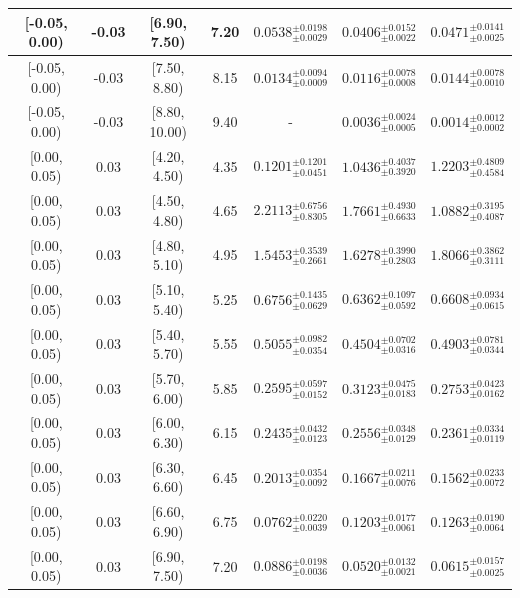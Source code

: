 \begin{longtable}{|c|c|c|c|c|c|c|}
\hline
[-0.05, 0.00) & -0.03 & [6.90, 7.50) & 7.20 & $0.0538^{ \pm 0.0198 }_{ \pm 0.0029 }$ & $0.0406^{ \pm 0.0152 }_{ \pm 0.0022 }$ & $0.0471^{ \pm 0.0141 }_{ \pm 0.0025 }$ \\ 
\hline
[-0.05, 0.00) & -0.03 & [7.50, 8.80) & 8.15 & $0.0134^{ \pm 0.0094 }_{ \pm 0.0009 }$ & $0.0116^{ \pm 0.0078 }_{ \pm 0.0008 }$ & $0.0144^{ \pm 0.0078 }_{ \pm 0.0010 }$ \\ 
\hline
[-0.05, 0.00) & -0.03 & [8.80, 10.00) & 9.40 & - & $0.0036^{ \pm 0.0024 }_{ \pm 0.0005 }$ & $0.0014^{ \pm 0.0012 }_{ \pm 0.0002 }$ \\ 
\hline
[0.00, 0.05) & 0.03 & [4.20, 4.50) & 4.35 & $0.1201^{ \pm 0.1201 }_{ \pm 0.0451 }$ & $1.0436^{ \pm 0.4037 }_{ \pm 0.3920 }$ & $1.2203^{ \pm 0.4809 }_{ \pm 0.4584 }$ \\ 
\hline
[0.00, 0.05) & 0.03 & [4.50, 4.80) & 4.65 & $2.2113^{ \pm 0.6756 }_{ \pm 0.8305 }$ & $1.7661^{ \pm 0.4930 }_{ \pm 0.6633 }$ & $1.0882^{ \pm 0.3195 }_{ \pm 0.4087 }$ \\ 
\hline
[0.00, 0.05) & 0.03 & [4.80, 5.10) & 4.95 & $1.5453^{ \pm 0.3539 }_{ \pm 0.2661 }$ & $1.6278^{ \pm 0.3990 }_{ \pm 0.2803 }$ & $1.8066^{ \pm 0.3862 }_{ \pm 0.3111 }$ \\ 
\hline
[0.00, 0.05) & 0.03 & [5.10, 5.40) & 5.25 & $0.6756^{ \pm 0.1435 }_{ \pm 0.0629 }$ & $0.6362^{ \pm 0.1097 }_{ \pm 0.0592 }$ & $0.6608^{ \pm 0.0934 }_{ \pm 0.0615 }$ \\ 
\hline
[0.00, 0.05) & 0.03 & [5.40, 5.70) & 5.55 & $0.5055^{ \pm 0.0982 }_{ \pm 0.0354 }$ & $0.4504^{ \pm 0.0702 }_{ \pm 0.0316 }$ & $0.4903^{ \pm 0.0781 }_{ \pm 0.0344 }$ \\ 
\hline
[0.00, 0.05) & 0.03 & [5.70, 6.00) & 5.85 & $0.2595^{ \pm 0.0597 }_{ \pm 0.0152 }$ & $0.3123^{ \pm 0.0475 }_{ \pm 0.0183 }$ & $0.2753^{ \pm 0.0423 }_{ \pm 0.0162 }$ \\ 
\hline
[0.00, 0.05) & 0.03 & [6.00, 6.30) & 6.15 & $0.2435^{ \pm 0.0432 }_{ \pm 0.0123 }$ & $0.2556^{ \pm 0.0348 }_{ \pm 0.0129 }$ & $0.2361^{ \pm 0.0334 }_{ \pm 0.0119 }$ \\ 
\hline
[0.00, 0.05) & 0.03 & [6.30, 6.60) & 6.45 & $0.2013^{ \pm 0.0354 }_{ \pm 0.0092 }$ & $0.1667^{ \pm 0.0211 }_{ \pm 0.0076 }$ & $0.1562^{ \pm 0.0233 }_{ \pm 0.0072 }$ \\ 
\hline
[0.00, 0.05) & 0.03 & [6.60, 6.90) & 6.75 & $0.0762^{ \pm 0.0220 }_{ \pm 0.0039 }$ & $0.1203^{ \pm 0.0177 }_{ \pm 0.0061 }$ & $0.1263^{ \pm 0.0190 }_{ \pm 0.0064 }$ \\ 
\hline
[0.00, 0.05) & 0.03 & [6.90, 7.50) & 7.20 & $0.0886^{ \pm 0.0198 }_{ \pm 0.0036 }$ & $0.0520^{ \pm 0.0132 }_{ \pm 0.0021 }$ & $0.0615^{ \pm 0.0157 }_{ \pm 0.0025 }$ \\ 

\end{longtable}
